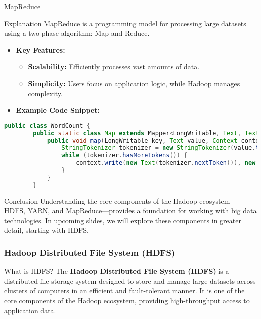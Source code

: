 \documentclass[aspectratio=169]{beamer}
\begin{document}
\begin{frame}[fragile]{MapReduce}
    \begin{block}{Explanation}
        MapReduce is a programming model for processing large datasets using a two-phase algorithm: Map and Reduce.
    \end{block}
    
    \begin{itemize}
        \item \textbf{Key Features:}
        \begin{itemize}
            \item \textbf{Scalability:} Efficiently processes vast amounts of data.
            \item \textbf{Simplicity:} Users focus on application logic, while Hadoop manages complexity.
        \end{itemize}
        \item \textbf{Example Code Snippet:}
    \end{itemize}
    
    \begin{lstlisting}[language=Java]
    public class WordCount {
        public static class Map extends Mapper<LongWritable, Text, Text, IntWritable> {
            public void map(LongWritable key, Text value, Context context) throws IOException, InterruptedException {
                StringTokenizer tokenizer = new StringTokenizer(value.toString());
                while (tokenizer.hasMoreTokens()) {
                    context.write(new Text(tokenizer.nextToken()), new IntWritable(1));
                }
            }
        }
    \end{lstlisting}
\end{frame}

\begin{frame}{Conclusion}
    Understanding the core components of the Hadoop ecosystem—HDFS, YARN, and MapReduce—provides a foundation for working with big data technologies. 
    In upcoming slides, we will explore these components in greater detail, starting with HDFS.
\end{frame}

\begin{frame}[fragile]
    \frametitle{Hadoop Distributed File System (HDFS)}
    \begin{block}{What is HDFS?}
        The \textbf{Hadoop Distributed File System (HDFS)} is a distributed file storage system designed to store and manage large datasets across clusters of computers in an efficient and fault-tolerant manner. It is one of the core components of the Hadoop ecosystem, providing high-throughput access to application data.
    \end{block}
\end{frame}
\end{document}
